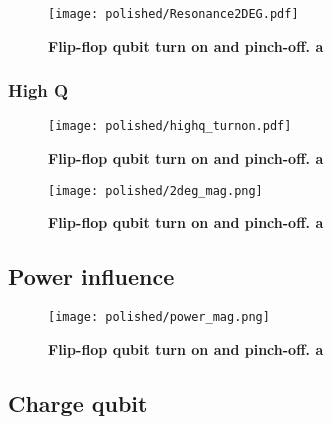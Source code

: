 \begin{figure}
	\centering
	\texttt{[image: polished/Resonance2DEG.pdf]}
	\caption[Flip-flop qubit turn on and pinch-off]{\textbf{Flip-flop qubit turn on and pinch-off. a}}
	\label{fig:lowq_2deg}
\end{figure}

\subsubsection{High Q}

\begin{figure}
	\centering
	\texttt{[image: polished/highq\_turnon.pdf]}
	\caption[Flip-flop qubit turn on and pinch-off]{\textbf{Flip-flop qubit turn on and pinch-off. a}}
	\label{fig:highq_turnon}
\end{figure}

\begin{figure}
	\centering
	\texttt{[image: polished/2deg\_mag.png]}
	\caption[Flip-flop qubit turn on and pinch-off]{\textbf{Flip-flop qubit turn on and pinch-off. a}}
	\label{fig:highq_2deg}
\end{figure}

\subsection{Power influence}


\begin{figure}
	\centering
	\texttt{[image: polished/power\_mag.png]}
	\caption[Flip-flop qubit turn on and pinch-off]{\textbf{Flip-flop qubit turn on and pinch-off. a}}
	\label{fig:res_power}
\end{figure}


\subsection{Charge qubit} \label{sec:res_chargequbit}
